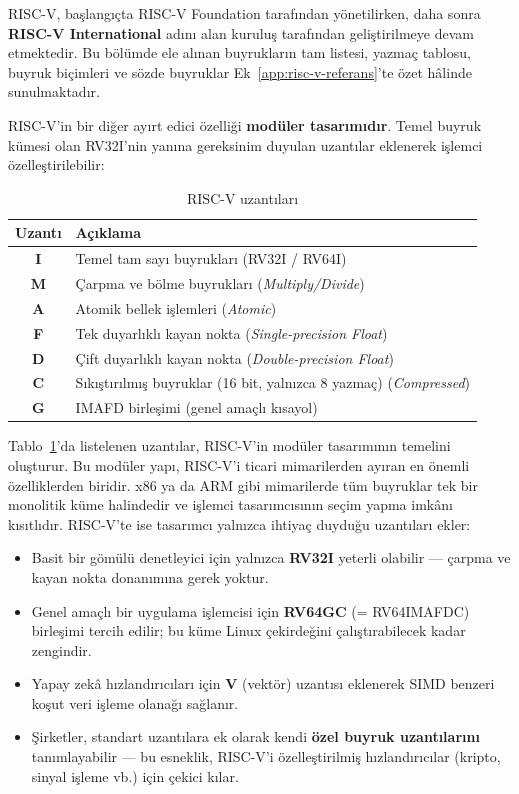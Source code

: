 RISC-V, başlangıçta RISC-V Foundation tarafından yönetilirken, daha sonra \textbf{RISC-V International} adını alan kuruluş tarafından geliştirilmeye devam etmektedir. Bu bölümde ele alınan buyrukların tam listesi, yazmaç tablosu, buyruk biçimleri ve sözde buyruklar Ek~\ref{app:risc-v-referans}'te özet hâlinde sunulmaktadır.

RISC-V'in bir diğer ayırt edici özelliği \textbf{modüler tasarımıdır}. Temel buyruk kümesi olan RV32I'nin yanına gereksinim duyulan uzantılar eklenerek işlemci özelleştirilebilir:

\begin{table}[H]
\centering
\caption{RISC-V uzantıları}
\label{tab:riscv-uzantilar}
\begin{tabular}{cl}
\toprule
\textbf{Uzantı} & \textbf{Açıklama} \\
\midrule
\textbf{I} & Temel tam sayı buyrukları (RV32I / RV64I) \\
\textbf{M} & Çarpma ve bölme buyrukları (\textit{Multiply/Divide}) \\
\textbf{A} & Atomik bellek işlemleri (\textit{Atomic}) \\
\textbf{F} & Tek duyarlıklı kayan nokta (\textit{Single-precision Float}) \\
\textbf{D} & Çift duyarlıklı kayan nokta (\textit{Double-precision Float}) \\
\textbf{C} & Sıkıştırılmış buyruklar (16 bit, yalnızca 8 yazmaç) (\textit{Compressed}) \\
\textbf{G} & IMAFD birleşimi (genel amaçlı kısayol) \\
\bottomrule
\end{tabular}
\end{table}

Tablo~\ref{tab:riscv-uzantilar}'da listelenen uzantılar, RISC-V'in modüler tasarımının temelini oluşturur. Bu modüler yapı, RISC-V'i ticari mimarilerden ayıran en önemli özelliklerden biridir. x86 ya da ARM gibi mimarilerde tüm buyruklar tek bir monolitik küme halindedir ve işlemci tasarımcısının seçim yapma imkânı kısıtlıdır. RISC-V'te ise tasarımcı yalnızca ihtiyaç duyduğu uzantıları ekler:
\begin{itemize}[nosep]
    \item Basit bir gömülü denetleyici için yalnızca \textbf{RV32I} yeterli olabilir --- çarpma ve kayan nokta donanımına gerek yoktur.
    \item Genel amaçlı bir uygulama işlemcisi için \textbf{RV64GC} (= RV64IMAFDC) birleşimi tercih edilir; bu küme Linux çekirdeğini çalıştırabilecek kadar zengindir.
    \item Yapay zekâ hızlandırıcıları için \textbf{V} (vektör) uzantısı eklenerek SIMD benzeri koşut veri işleme olanağı sağlanır.
    \item Şirketler, standart uzantılara ek olarak kendi \textbf{özel buyruk uzantılarını} tanımlayabilir --- bu esneklik, RISC-V'i özelleştirilmiş hızlandırıcılar (kripto, sinyal işleme vb.) için çekici kılar.
\end{itemize}

